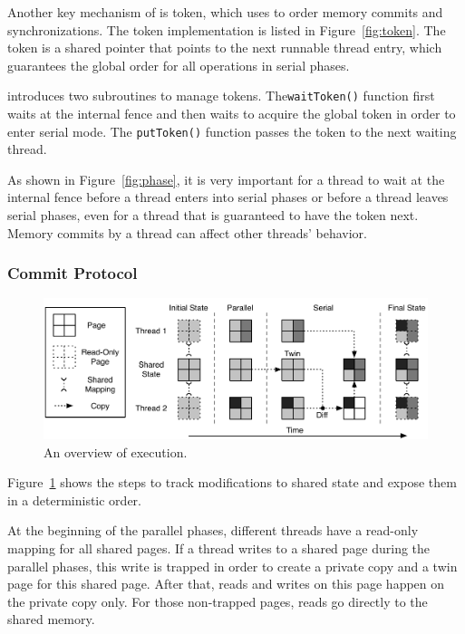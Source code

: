 Another key mechanism of \dthreads{} is token, which \dthreads{} uses to  order memory commits and synchronizations. The token implementation is listed in Figure~\ref{fig:token}. The token is a shared pointer that points to the next runnable thread entry, which guarantees the global order for all operations in serial phases.  

\dthreads{} introduces two subroutines to manage tokens.  The\texttt{waitToken()} function first waits at the internal fence and then waits to acquire the global token in order to enter serial mode. The \texttt{putToken()} function passes the token to the next waiting thread. 

As shown in Figure~\ref{fig:phase}, it is very important for a thread to wait at the internal fence before a thread enters into serial phases or before a thread leaves serial phases, even for a thread that is guaranteed to have the token next. Memory commits by a thread can affect other threads' behavior. 

\subsubsection{Commit Protocol}
\begin{figure}
{\centering
\includegraphics[width=5in]{dthreads/figure/architecture-diagram}
\caption{An overview of \dthreads{} execution.\label{fig:architecture}}
}
\end{figure}

Figure~\ref{fig:architecture} shows the steps to track modifications to shared state and expose them in a deterministic order.  

At the beginning of the parallel phases, different threads have a read-only mapping for all shared pages. If a thread writes to a shared page during the parallel phases, this write is trapped in order to create a private copy and a twin page for this shared page. After that, reads and writes on this page happen on the private copy only. For those non-trapped pages, reads go directly to the shared memory.  

